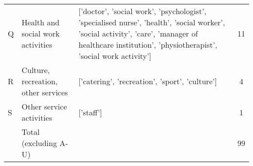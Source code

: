 \documentclass[man]{apa7}
\begin{document}
\begin{table}
\begin{longtable}{@{}L{0.05}L{0.25}L{0.5}C{0.1}@{}}
        Q & Health and social work activities & ['doctor', 'social work', 'psychologist', 'specialised nurse', 'health', 'social worker', 'social activity', 'care', 'manager of healthcare institution', 'physiotherapist', 'social work activity'] & 11 \\
        R & Culture, recreation, other services & ['catering', 'recreation', 'sport', 'culture'] & 4 \\
        S & Other service activities & ['staff'] & 1 \\
        ~ & Total (excluding A-U) & ~ & 99 \\

        \end{longtable}
    \end{table}

\end{document}
